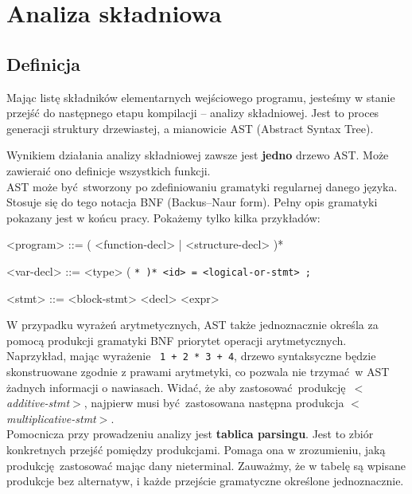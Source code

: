 \section{Analiza składniowa}
	
	\subsection{Definicja}

		Mając listę składników elementarnych wejściowego programu, jesteśmy w stanie przejść do
		następnego etapu kompilacji -- analizy składniowej. Jest to proces generacji struktury
		drzewiastej, a mianowicie AST (Abstract Syntax Tree).
		\spacing
		
		Wynikiem działania analizy składniowej zawsze jest \textbf{jedno} drzewo AST. Może zawieraić ono
		definicje wszystkich funkcji.
		\\
	
		AST może być stworzony po zdefiniowaniu gramatyki regularnej danego języka. Stosuje się
		do tego notacja BNF (Backus–Naur form). Pełny opis gramatyki pokazany jest w końcu pracy. Pokażemy
		tylko kilka przykładów:
		
		\spacing

		\setlength{\grammarindent}{12em}

		\begin{grammar}
		    <program> ::= ( <function-decl> | <structure-decl> )*

		    <var-decl> ::= <type> ( \tt{*} )* <id> \tt{=} <logical-or-stmt> \tt{;}

		    <stmt> ::= <block-stmt>
		    \alt <selection-stmt>
		    \alt <iteration-stmt>
		    \alt <jump-stmt>
		    \alt <assignment-stmt>
		    \alt <primary-stmt>
		\end{grammar}
		
		\spacing
		
		W przypadku wyrażeń arytmetycznych, AST także jednoznacznie określa za pomocą produkcji
		gramatyki BNF priorytet operacji
		arytmetycznych. Naprzykład, mając wyrażenie \ \texttt{1 + 2 * 3 + 4}, drzewo syntaksyczne
		będzie skonstruowane zgodnie z prawami arytmetyki, co pozwala nie trzymać w AST żadnych
		informacji o nawiasach. Widać, że aby zastosować produkcję \textit{$<$additive-stmt$>$},
		najpierw musi być zastosowana następna produkcja \textit{$<$multiplicative-stmt$>$}.
		\\

		Pomocnicza przy prowadzeniu analizy jest \textbf{tablica parsingu}. Jest to zbiór
		konkretnych przejść pomiędzy produkcjami. Pomaga ona w zrozumieniu, jaką
		produkcję zastosować mając dany nieterminal. Zauważmy, że w tabelę są wpisane produkcje bez
		alternatyw, i każde przejście gramatyczne określone jednoznacznie.
		\\
		
